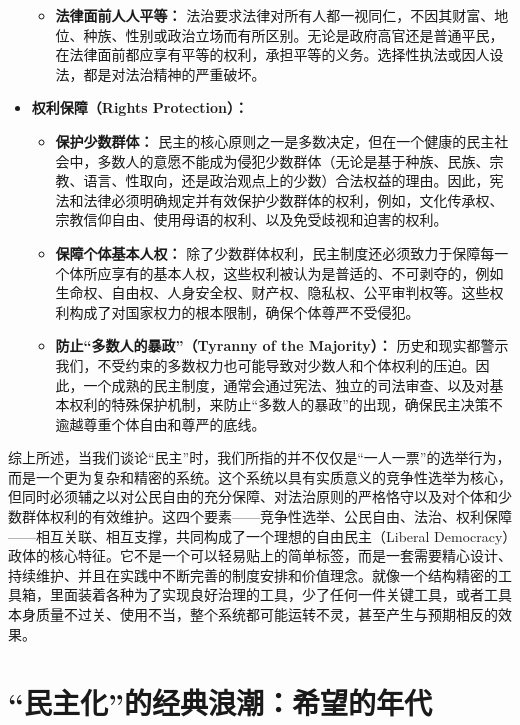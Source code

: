\documentclass[UTF8, 10pt]{ctexbook}
\begin{document}
\begin{itemize}
\begin{itemize}
        \item \textbf{法律面前人人平等：} 法治要求法律对所有人都一视同仁，不因其财富、地位、种族、性别或政治立场而有所区别。无论是政府高官还是普通平民，在法律面前都应享有平等的权利，承担平等的义务。选择性执法或因人设法，都是对法治精神的严重破坏。
    \end{itemize}
    \item \textbf{权利保障（Rights Protection）：}
    \begin{itemize}
        \item \textbf{保护少数群体：} 民主的核心原则之一是多数决定，但在一个健康的民主社会中，多数人的意愿不能成为侵犯少数群体（无论是基于种族、民族、宗教、语言、性取向，还是政治观点上的少数）合法权益的理由。因此，宪法和法律必须明确规定并有效保护少数群体的权利，例如，文化传承权、宗教信仰自由、使用母语的权利、以及免受歧视和迫害的权利。
        \item \textbf{保障个体基本人权：} 除了少数群体权利，民主制度还必须致力于保障每一个体所应享有的基本人权，这些权利被认为是普适的、不可剥夺的，例如生命权、自由权、人身安全权、财产权、隐私权、公平审判权等。这些权利构成了对国家权力的根本限制，确保个体尊严不受侵犯。
        \item \textbf{防止“多数人的暴政”（Tyranny of the Majority）：} 历史和现实都警示我们，不受约束的多数权力也可能导致对少数人和个体权利的压迫。因此，一个成熟的民主制度，通常会通过宪法、独立的司法审查、以及对基本权利的特殊保护机制，来防止“多数人的暴政”的出现，确保民主决策不逾越尊重个体自由和尊严的底线。
    \end{itemize}
\end{itemize}

综上所述，当我们谈论“民主”时，我们所指的并不仅仅是“一人一票”的选举行为，而是一个更为复杂和精密的系统。这个系统以具有实质意义的竞争性选举为核心，但同时必须辅之以对公民自由的充分保障、对法治原则的严格恪守以及对个体和少数群体权利的有效维护。这四个要素——竞争性选举、公民自由、法治、权利保障——相互关联、相互支撑，共同构成了一个理想的自由民主（Liberal Democracy）政体的核心特征。它不是一个可以轻易贴上的简单标签，而是一套需要精心设计、持续维护、并且在实践中不断完善的制度安排和价值理念。就像一个结构精密的工具箱，里面装着各种为了实现良好治理的工具，少了任何一件关键工具，或者工具本身质量不过关、使用不当，整个系统都可能运转不灵，甚至产生与预期相反的效果。

\section{“民主化”的经典浪潮：希望的年代}
\end{document}
